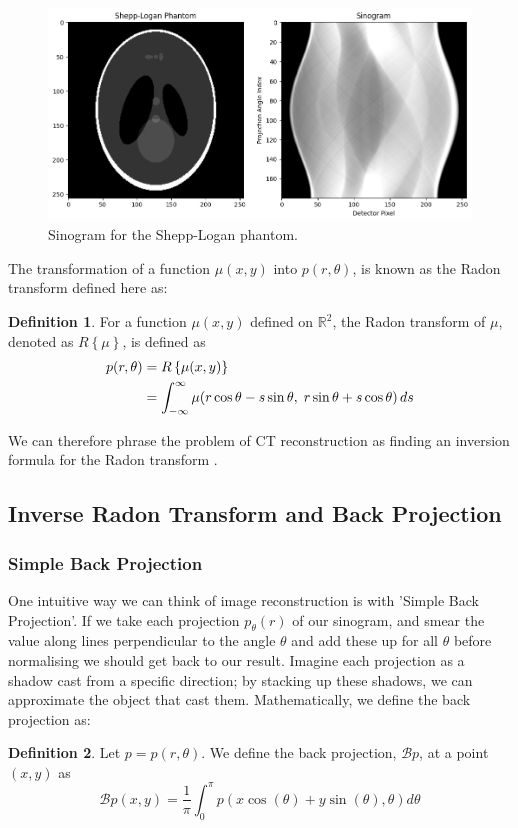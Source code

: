 \documentclass{article}
\theoremstyle{definition}
\newtheorem{definition}{Definition}[section]
\begin{document}
\begin{figure}[H]
	\includegraphics[scale=0.5]{sinogramshepp.png}
	\caption{Sinogram for the Shepp-Logan phantom.}
	\label{fig:sinogramshepp}
\end{figure}

The transformation of a function $\mu (x,y)$ into $p(r, \theta)$, is known as the Radon transform defined here as:
\begin{definition}
For a function $\mu(x,y)$ defined on $\mathbb{R}^2$, the Radon transform of $\mu$, denoted as $R\left\{\mu \right\}$, is defined as
\begin{align*}
p(r, \theta) &= R \left\{ \mu(x,y) \right\} \notag \\
             &= \int_{-\infty}^{\infty} \mu(r \cos\theta - s \sin\theta,\; r \sin\theta + s \cos\theta) \, ds
\end{align*}
\end{definition}
We can therefore phrase the problem of CT reconstruction as finding an inversion formula for the Radon transform \cite{Beatty2012}. 

\subsection{Inverse Radon Transform and Back Projection}
\subsubsection{Simple Back Projection}
One intuitive way we can think of image reconstruction is with 'Simple Back Projection'. If we take each projection $p_\theta (r)$ of our sinogram, and smear the value along lines perpendicular to the angle $\theta$ and add these up for all $\theta$ before normalising we should get back to our result. Imagine each projection as a shadow cast from a specific direction; by stacking up these shadows, we can approximate the object that cast them.
Mathematically, we define the back projection as:
\begin{definition}
Let $p = p(r, \theta)$. We define the back projection, $\mathcal{B} p$, at a point $(x,y)$ as
$$
\mathcal{B} p(x,y) = \frac{1}{\pi} \int_{0}^{\pi} p(x \cos(\theta) + y \sin(\theta), \theta) d\theta
$$
\end{definition}
\end{document}
